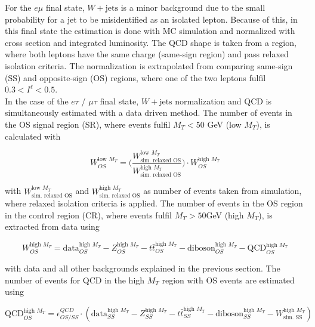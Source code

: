 For the $e\mu$ final state, $W + \text{jets}$ is a minor background due to the small probability for a jet to be misidentified as an isolated lepton. Because of this, in this final state the estimation is done with \gls{MC} simulation and normalized with cross section and integrated luminosity. The \gls{QCD} shape is taken from a region, where both leptons have the same charge (same-sign region) and pass relaxed isolation criteria. The normalization is extrapolated from comparing same-sign (SS) and opposite-sign (OS) regions, where one of the two leptons fulfil $0.3 < I^{\ell} < 0.5$.  \\

In the case of the $e\tau$ / $\mu\tau$ final state, $W + \text{jets}$ normalization and \gls{QCD} is simultaneously estimated with a data driven method. The number of events in the OS signal region (SR), where events fulfil $M_T < 50$ GeV (low $M_T$), is calculated with 

\begin{equation}
	W^{\text{low } M_T}_{OS} = \Bigg(\frac{W^{\text{low } M_T}_{\text{sim. relaxed OS}}}{W^{\text{high } M_T}_{\text{sim. relaxed OS}}}\Bigg) \cdot W^{\text{high } M_T}_{OS}
\end{equation}

with $W^{\text{low } M_T}_{\text{sim. relaxed OS}}$ and $W^{\text{high } M_T}_{\text{sim. relaxed OS}}$ as number of events taken from simulation, where relaxed isolation criteria is applied. The number of events in the OS region in the control region (CR), where events fulfil $M_T > 50$GeV (high $M_T$), is extracted from data using 

\begin{equation}
	W^{\text{high } M_T}_{OS} = \text{data}^{\text{high } M_T}_{OS} - Z^{\text{high } M_T}_{OS} - t\bar{t}^{\text{high } M_T}_{OS} - \text{diboson}^{\text{high } M_T}_{OS} - \text{QCD}^{\text{high } M_T}_{OS}
\end{equation}

with data and all other backgrounds explained in the previous section. The number of events for QCD in the high $M_T$ region with OS events are estimated using

\begin{equation}
\text{QCD}^{\text{high } M_T}_{OS} = \epsilon^{QCD}_{OS/SS} \cdot (\text{data}^{\text{high } M_T}_{SS} - Z^{\text{high } M_T}_{SS} - t\bar{t}^{\text{high } M_T}_{SS} - \text{diboson}^{\text{high } M_T}_{SS} - W^{\text{high } M_T}_{\text{sim. SS}})
\end{equation}

